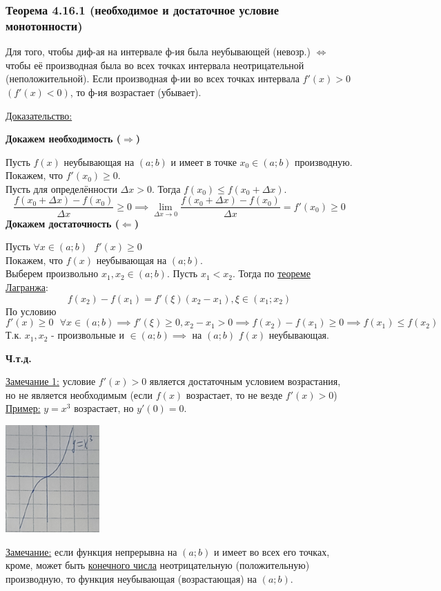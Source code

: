 \documentclass[12pt]{article}
\begin{document}
    \subsubsection*{Теорема 4.16.1 (необходимое и достаточное условие монотонности)}\label{th:4.16.1}
    Для того, чтобы диф-ая на интервале ф-ия была неубывающей (невозр.) $\Leftrightarrow$ чтобы её производная была во всех точках интервала неотрицательной (неположительной).
    Если производная ф-ии во всех точках интервала $f'(x) > 0$ $(f'(x) < 0)$, то ф-ия возрастает (убывает).\par\noindent
    \underline{Доказательство:}
    \begin{adjustwidth}{1.5em}{1.5em}
        \textbf{Докажем необходимость ($\Rightarrow$)}\par\noindent
        Пусть $f(x)$ неубывающая на $(a; b)$ и имеет в точке $x_0 \in (a; b)$ производную.\\
        Покажем, что $f'(x_0) \ge 0$.\\
        Пусть для определённости $\Delta x > 0$. Тогда $f(x_0) \le f(x_0 + \Delta x)$.
        \[ \frac{f(x_0 + \Delta x) - f(x_0)}{\Delta x} \ge 0 \implies \lim_{\Delta x \to 0} \frac{f(x_0 + \Delta x) - f(x_0)}{\Delta x} = f'(x_0) \ge 0 \]
        \textbf{Докажем достаточность ($\Leftarrow$)}\par\noindent
        Пусть $\forall x \in (a; b) \text{ } f'(x) \ge 0$\\
        Покажем, что $f(x)$ неубывающая на $(a;b)$.\\
        Выберем произвольно $x_1, x_2 \in (a; b)$. Пусть $x_1 < x_2$. Тогда по \hyperref[th:4.12.4]{теореме Лагранжа}:
        \[ f(x_2) - f(x_1) = f'(\xi)(x_2-x_1), \xi \in (x_1; x_2) \]
        По условию \[f'(x) \ge 0 \text{ } \forall x \in (a; b) \implies f'(\xi) \ge 0, x_2 - x_1 > 0 \implies f(x_2) - f(x_1) \ge 0 \implies f(x_1) \le f(x_2)\]
        Т.к. $x_1, x_2$ - произвольные и $\in (a; b) \implies$ на $(a;b)$ $f(x)$ неубывающая.
        \begin{center}
            \textbf{Ч.т.д.}
        \end{center}
    \end{adjustwidth}
    \underline{Замечание 1:} условие $f'(x) > 0$ является достаточным условием возрастания, но не является необходимым (если $f(x)$ возрастает, то не везде $f'(x) > 0$)\\
    \underline{Пример:} $y = x^3$ возрастает, но $y'(0) = 0$.
    \begin{center}
        \includegraphics{4.16.1}
    \end{center}
    \underline{Замечание:} если функция непрерывна на $(a;b)$ и имеет во всех его точках, кроме, может быть \underline{конечного числа} неотрицательную (положительную) производную, то функция неубывающая (возрастающая) на $(a;b)$.
\end{document}
